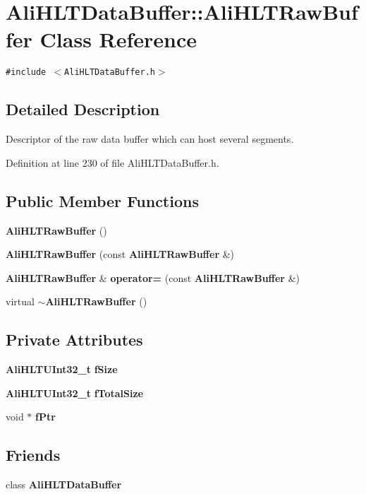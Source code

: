 \section{Ali\-HLTData\-Buffer::Ali\-HLTRaw\-Buffer Class Reference}
\label{classAliHLTDataBuffer_1_1AliHLTRawBuffer}
{\tt \#include $<$Ali\-HLTData\-Buffer.h$>$}



\subsection{Detailed Description}
Descriptor of the raw data buffer which can host several segments. 



Definition at line 230 of file Ali\-HLTData\-Buffer.h.\subsection*{Public Member Functions}
\begin{CompactItemize}
\item 
{\bf Ali\-HLTRaw\-Buffer} ()
\item 
{\bf Ali\-HLTRaw\-Buffer} (const {\bf Ali\-HLTRaw\-Buffer} \&)
\item 
{\bf Ali\-HLTRaw\-Buffer} \& {\bf operator=} (const {\bf Ali\-HLTRaw\-Buffer} \&)
\item 
virtual {\bf $\sim$Ali\-HLTRaw\-Buffer} ()
\end{CompactItemize}
\subsection*{Private Attributes}
\begin{CompactItemize}
\item 
{\bf Ali\-HLTUInt32\_\-t} {\bf f\-Size}
\item 
{\bf Ali\-HLTUInt32\_\-t} {\bf f\-Total\-Size}
\item 
void $\ast$ {\bf f\-Ptr}
\end{CompactItemize}
\subsection*{Friends}
\begin{CompactItemize}
\item 
class {\bf Ali\-HLTData\-Buffer}
\end{CompactItemize}


